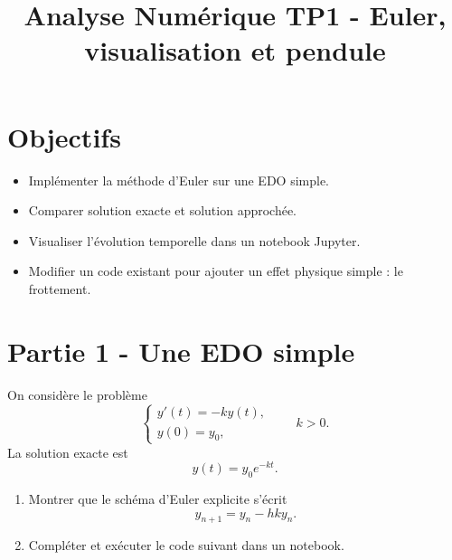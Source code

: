 
\usepackage{listings}

\lstset{
    basicstyle=\ttfamily\small,
    breaklines=true,
    frame=single,
    columns=fullflexible,
    keepspaces=true
}

\title{Analyse Numérique TP1 - Euler, visualisation et pendule}

\author{}
\date{}

\newenvironment{solution}
    {\par\vspace{0.5em}\begin{mdframed}[linewidth=0.5pt]\par}
    {\end{mdframed}\par\vspace{0.5em}}


\sffamily
\maketitle

\section*{Objectifs}
\begin{itemize}
    \item Implémenter la méthode d'Euler sur une EDO simple.
    \item Comparer solution exacte et solution approchée.
    \item Visualiser l'évolution temporelle dans un notebook Jupyter.
    \item Modifier un code existant pour ajouter un effet physique simple : le frottement.
\end{itemize}

\section*{Partie 1 - Une EDO simple}
On considère le problème
\[
\begin{cases}
y'(t)=-ky(t),\\
y(0)=y_0,
\end{cases}
\qquad k>0.
\]
La solution exacte est
\[
y(t)=y_0e^{-kt}.
\]

\begin{enumerate}
    \item Montrer que le schéma d'Euler explicite s'écrit
    \[
    y_{n+1}=y_n-hky_n.
    \]

    \item Compléter et exécuter le code suivant dans un notebook.
\end{enumerate}


